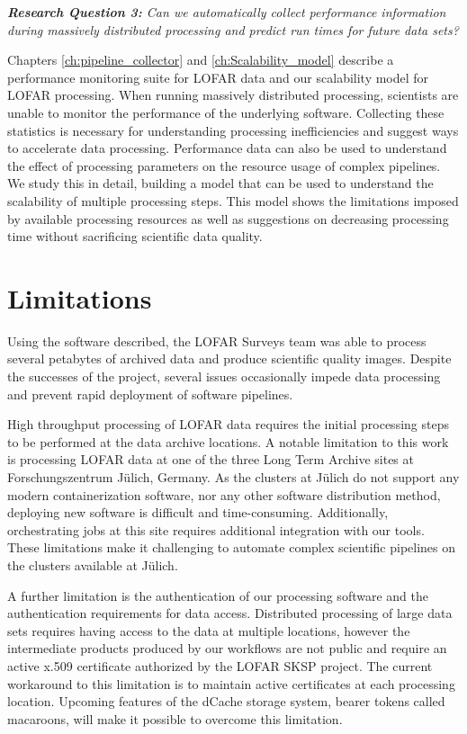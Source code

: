 \begin{addmargin}[4em]{8em}%
    \emph{\textbf{Research Question 3:} Can we automatically collect performance information during massively distributed processing and predict run times for future data sets?}
\end{addmargin}

Chapters \ref{ch:pipeline_collector} and \ref{ch:Scalability_model} describe a performance monitoring suite for LOFAR data and our scalability model for LOFAR processing. When running massively distributed processing, scientists are unable to monitor the performance of the underlying software. Collecting these statistics is necessary for understanding processing inefficiencies and suggest ways to accelerate data processing. Performance data can also be used to understand the effect of processing parameters on the resource usage of complex pipelines. We study this in detail, building a model that can be used to understand the scalability of multiple processing steps. This model shows the limitations imposed by available processing resources as well as suggestions on decreasing processing time without sacrificing scientific data quality. 

\section{Limitations}

Using the software described, the LOFAR Surveys team was able to process several petabytes of archived data and produce scientific quality images. Despite the successes of the project, several issues occasionally impede data processing and prevent rapid deployment of software pipelines.

High throughput processing of LOFAR data requires the initial processing steps to be performed at the data archive locations. A notable limitation to this work is processing LOFAR data at one of the three Long Term Archive sites at Forschungszentrum J{\"u}lich, Germany. As the clusters at J{\"u}lich do not support any modern containerization software, nor any other software distribution method, deploying new software is difficult and time-consuming. Additionally, orchestrating jobs at this site requires additional integration with our tools. These limitations make it challenging to automate complex scientific pipelines on the clusters available at J{\"u}lich.

A further limitation is the authentication of our processing software and the authentication requirements for data access. Distributed processing of large data sets requires having access to the data at multiple locations, however the intermediate products produced by our workflows are not public and require an active x.509 certificate authorized by the LOFAR SKSP project. The current workaround to this limitation is to maintain active certificates at each processing location. Upcoming features of the dCache storage system, bearer tokens called macaroons, will make it possible to overcome this limitation.

